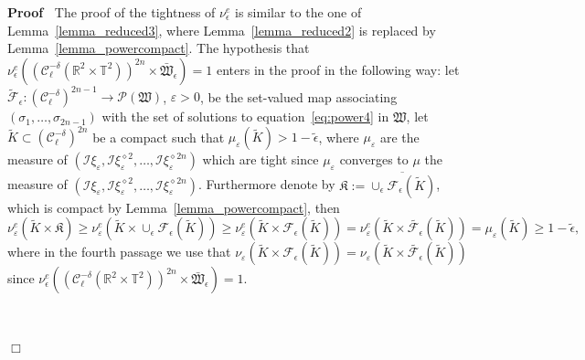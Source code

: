\documentclass[a4paper,10pt]{article}
\newcommand{\assign}{:=}
\newenvironment{proof}{\noindent\textbf{Proof\ }}{\hspace*{\fill}$\Box$\medskip}
\begin{document}
\begin{proof}
  The proof of the tightness of $\nu_{\epsilon}^e$ is similar to the one of
  Lemma~\ref{lemma_reduced3}, where Lemma~\ref{lemma_reduced2} is replaced by
  Lemma~\ref{lemma_powercompact}. The hypothesis that $\nu^e_{\epsilon}
  ((\mathcal{C}^{- \delta}_{\ell} (\mathbb{R}^2 \times \mathbb{T}^2))^{2 n}
  \times \mathfrak{\bar{W}}_{\epsilon}) = 1$ enters in the proof in the
  following way: let $\widetilde{\mathcal{F}}_{\epsilon} : (\mathcal{C}^{-
  \delta}_{\ell})^{2 n - 1} \rightarrow \mathcal{P} (\mathfrak{W})$,
  $\varepsilon > 0$, be the set-valued map associating $(\sigma_1, \ldots,
  \sigma_{2 n - 1})$ with the set of solutions to equation~{\eqref{eq:power4}}
  in $\mathfrak{W}$, let $\tilde{K} \subset (\mathcal{C}^{- \delta}_{\ell})^{2
  n}$ be a compact such that $\mu_{\varepsilon} (\tilde{K}) > 1 -
  \tilde{\epsilon}$, where $\mu_{\varepsilon}$ are the measure of
  $(\mathcal{I} \xi_{\varepsilon}, \mathcal{I} \xi_{\varepsilon}^{\diamond 2},
  \ldots, \mathcal{I} \xi_{\varepsilon}^{\diamond 2 n})$ which are tight since
  $\mu_{\varepsilon}$ converges to $\mu$ the measure of $(\mathcal{I}
  \xi_{\varepsilon}, \mathcal{I} \xi_{\varepsilon}^{\diamond 2}, \ldots,
  \mathcal{I} \xi_{\varepsilon}^{\diamond 2 n})$. Furthermore denote by
  $\mathfrak{K} \assign \overline{\cup_{\epsilon} \mathcal{F}_{\epsilon}
  (\tilde{K})}$, which is compact by Lemma~\ref{lemma_powercompact}, then
  \[ \nu_{\varepsilon}^e (\tilde{K} \times \mathfrak{K}) \geqslant
     \nu_{\varepsilon}^e (\tilde{K} \times \cup_{\epsilon}
     \mathcal{F}_{\epsilon} (\tilde{K})) \geqslant \nu_{\varepsilon}^e
     (\tilde{K} \times \mathcal{F}_{\epsilon} (\tilde{K})) =
     \nu_{\varepsilon}^e (\tilde{K} \times \widetilde{\mathcal{F}_{\epsilon}}
     (\tilde{K})) = \mu_{\varepsilon} (\tilde{K}) \geqslant 1 -
     \tilde{\epsilon}, \]
  where in the fourth passage we use that $\nu_{\varepsilon} (\tilde{K} \times
  \mathcal{F}_{\epsilon} (\tilde{K})) = \nu_{\varepsilon} (\tilde{K} \times
  \widetilde{\mathcal{F}_{\epsilon}} (\tilde{K}))$ since $\nu^e_{\epsilon}
  ((\mathcal{C}^{- \delta}_{\ell} (\mathbb{R}^2 \times \mathbb{T}^2))^{2 n}
  \times \mathfrak{\bar{W}}_{\epsilon}) = 1$.
  
  \
  

\end{proof}
\end{document}
